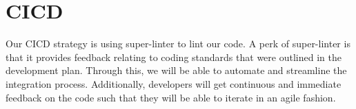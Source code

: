 \documentclass{article}
\begin{document}

\section{CICD}

Our CICD strategy is using super-linter to lint our code. A perk of super-linter is that it provides feedback relating to coding standards that were outlined in the development plan. Through this, we will be able to automate and streamline the integration process. Additionally, developers will get continuous and immediate feedback on the code such that they will be able to iterate in an agile fashion.
\end{document}
